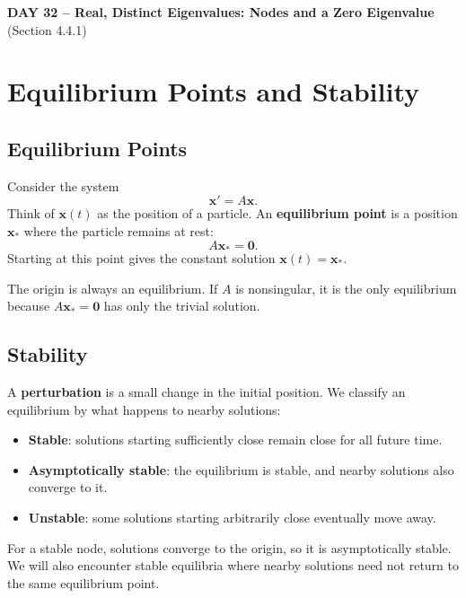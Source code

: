 \documentclass[10pt,letterpaper]{article}
\begin{document}
\begin{center}
\Large\textbf{DAY 32 -- Real, Distinct Eigenvalues:
Nodes and a Zero Eigenvalue}\\
\normalsize (Section 4.4.1)
\end{center}

\section{Equilibrium Points and Stability}

\subsection{Equilibrium Points}

Consider the system
\[
\mathbf{x}'=A\mathbf{x}.
\]
Think of $\mathbf{x}(t)$ as the position of a particle.
An \textbf{equilibrium point} is a position
$\mathbf{x}_*$ where the particle remains at rest:
\[
\boxed{A\mathbf{x}_*=\mathbf{0}.}
\]
Starting at this point gives the constant solution
$\mathbf{x}(t)=\mathbf{x}_*$.

The origin is always an equilibrium. If $A$ is
nonsingular, it is the only equilibrium because
$A\mathbf{x}_*=\mathbf{0}$ has only the trivial solution.

\subsection{Stability}

A \textbf{perturbation} is a small change in the
initial position. We classify an equilibrium by
what happens to nearby solutions:
\begin{itemize}
    \item \textbf{Stable}: solutions starting sufficiently
    close remain close for all future time.

    \item \textbf{Asymptotically stable}: the equilibrium
    is stable, and nearby solutions also converge to it.

    \item \textbf{Unstable}: some solutions starting
    arbitrarily close eventually move away.
\end{itemize}

For a stable node, solutions converge to the origin,
so it is asymptotically stable. We will also encounter
stable equilibria where nearby solutions need not
return to the same equilibrium point.
\end{document}
